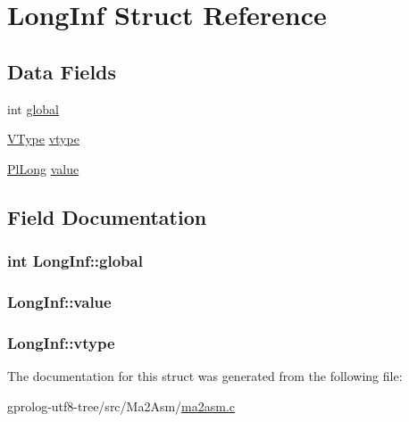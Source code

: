 \hypertarget{structLongInf}{}\section{Long\+Inf Struct Reference}
\label{structLongInf}
\subsection*{Data Fields}
\begin{DoxyCompactItemize}
\item 
int \hyperlink{structLongInf_a2a21c022832de0f854940c3a39233cec}{global}
\item 
\hyperlink{ma__parser_8h_a28a778aedb7441c6b9755e1882b58dc9}{V\+Type} \hyperlink{structLongInf_a43f3ac657d3dabca28037f16891e4092}{vtype}
\item 
\hyperlink{gprolog_8h_a4d005b136d7fb28537eb1815f7868b63}{Pl\+Long} \hyperlink{structLongInf_ab45336cb32ee695b77f51b6490a81875}{value}
\end{DoxyCompactItemize}


\subsection{Field Documentation}
\subsubsection[{\texorpdfstring{global}{global}}]{\setlength{\rightskip}{0pt plus 5cm}int Long\+Inf\+::global}\hypertarget{structLongInf_a2a21c022832de0f854940c3a39233cec}{}\label{structLongInf_a2a21c022832de0f854940c3a39233cec}
\subsubsection[{\texorpdfstring{value}{value}}]{ Long\+Inf\+::value}\hypertarget{structLongInf_ab45336cb32ee695b77f51b6490a81875}{}\label{structLongInf_ab45336cb32ee695b77f51b6490a81875}
\subsubsection[{\texorpdfstring{vtype}{vtype}}]{ Long\+Inf\+::vtype}\hypertarget{structLongInf_a43f3ac657d3dabca28037f16891e4092}{}\label{structLongInf_a43f3ac657d3dabca28037f16891e4092}


The documentation for this struct was generated from the following file\+:\begin{DoxyCompactItemize}
\item 
gprolog-\/utf8-\/tree/src/\+Ma2\+Asm/\hyperlink{ma2asm_8c}{ma2asm.\+c}\end{DoxyCompactItemize}

